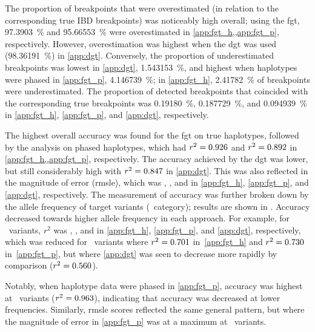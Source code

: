 %

%

The proportion of breakpoints that were overestimated (in relation to the corresponding true IBD breakpoints) was noticeably high overall; using the \gls{fgt}, \SI{97.3903}{\percent} and \SI{95.66553}{\percent} were overestimated in \cref{app:fgt_h,,app:fgt_p}, respectively.
However, overestimation was highest when the \gls{dgt} was used (\SI{98.36191}{\percent}) in \cref{app:dgt}.
Conversely, the proportion of underestimated breakpoints was lowest in \ref{app:dgt}, \SI{1.543153}{\percent}, and highest when haplotypes were phased in \ref{app:fgt_p}, \SI{4.146739}{\percent}; in \ref{app:fgt_h}, \SI{2.41782}{\percent} of breakpoints were underestimated.
The proportion of detected breakpoints that coincided with the corresponding true breakpoints was \SI{0.19180}{\percent}, \SI{0.187729}{\percent}, and \SI{0.094939}{\percent} in \ref{app:fgt_h}, \ref{app:fgt_p}, and \ref{app:dgt}, respectively.

The highest overall accuracy was found for the \gls{fgt} on true haplotypes, followed by the analysis on phased haplotypes, which had ${r^2 = \dec{0.9262482}}$ and ${r^2 = \dec{0.8922048}}$ in \cref{app:fgt_h,,app:fgt_p}, respectively.
The accuracy achieved by the \gls{dgt} was lower, but still considerably high with ${r^2 = \dec{0.8474036}}$ in \cref{app:dgt}.
This was also reflected in the  magnitude of error (\gls{rmsle}), which was , , and  in \ref{app:fgt_h}, \ref{app:fgt_p}, and \ref{app:dgt}, respectively.
The measurement of accuracy was further broken down by the allele frequency of target variants (\fk{}~category); results are shown in .
Accuracy decreased towards higher allele frequency in each approach.
For example, for ~variants, $r^2$ was , , and  in \ref{app:fgt_h}, \ref{app:fgt_p}, and \ref{app:dgt}, respectively,
which was reduced for ~variants where ${r^2 = \dec{0.701}}$ in~\ref{app:fgt_h} and ${r^2 = \dec{0.730}}$ in~\ref{app:fgt_p}, but where \ref{app:dgt} was seen to decrease more rapidly by comparison (${r^2 = \dec{0.560}}$).

Notably, when haplotype data were phased in \cref{app:fgt_p}, accuracy was highest at ~variants (${r^2 = \dec{0.963}}$), indicating that accuracy was decreased at lower frequencies.
Similarly, \gls{rmsle} scores reflected the same general pattern, but where the magnitude of error in \ref{app:fgt_p} was at a maximum at ~variants.

